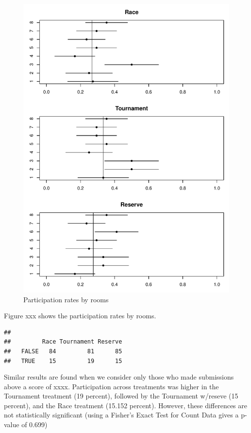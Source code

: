 \documentclass[12pt,]{article}
\theoremstyle{plain} %
\begin{document}
\begin{figure}
\centering
\includegraphics{Figures/unnamed-chunk-12-1.pdf}
\caption{Participation rates by rooms}
\end{figure}

Figure xxx shows the participation rates by rooms.

\begin{verbatim}
##        
##         Race Tournament Reserve
##   FALSE   84         81      85
##   TRUE    15         19      15
\end{verbatim}

Similar results are found when we consider only those who made
submissions above a score of xxxx. Participation across treatments was
higher in the Tournament treatment (19 percent), followed by the
Tournament w/reseve (15 percent), and the Race treatment (15.152
percent). However, these differences are not statistically significant
(using a Fisher's Exact Test for Count Data gives a p-value of 0.699)
\end{document}
